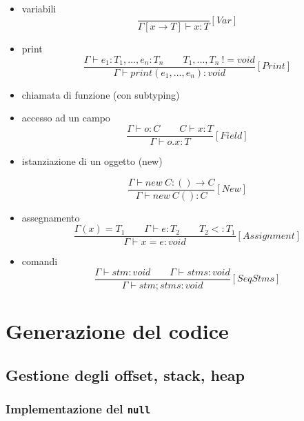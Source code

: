 \documentclass[a4paper]{article}   %
\begin{document}
\begin{itemize}
  \item variabili %
  $$ \frac{}{\Gamma [x \rightarrow T] \vdash x : T}[Var] $$

  \item print %
  $$ \frac{\Gamma \vdash e_1 : T_1, ..., e_n : T_n \qquad T_1,...,T_n\ != void}{\Gamma \vdash print(e_1,...,e_n) : void }[Print]$$

  \item chiamata di funzione (con subtyping)


  \item accesso ad un campo
  $$ \frac{\Gamma \vdash o : C \qquad C \vdash x : T}{\Gamma \vdash o.x : T}[Field] $$

  \item istanziazione di un oggetto (new) %

  $$ \frac{\Gamma \vdash new \ C : () \rightarrow C}{\Gamma \vdash new \ C() : C}[New] $$

  \item assegnamento %
  $$ \frac{\Gamma(x) = T_1 \qquad \Gamma \vdash e : T_2 \qquad T_2 <: T_1}{\Gamma \vdash x = e : void}[Assignment] $$

  \item comandi
  $$ \frac{\Gamma \vdash stm : void \qquad \Gamma \vdash stms : void}{\Gamma \vdash stm ; stms : void}[SeqStms] $$
\end{itemize}
\section{Generazione del codice}

\subsection{Gestione degli offset, stack, heap}
\subsubsection{Implementazione del \lstinline|null|}
\end{document}
